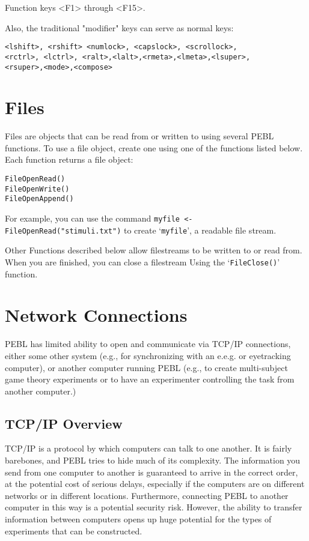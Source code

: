 Function keys <F1> through <F15>.

Also, the traditional "modifier" keys can serve as normal keys:


\begin{verbatim}
<lshift>, <rshift> <numlock>, <capslock>, <scrollock>, 
<rctrl>, <lctrl>, <ralt>,<lalt>,<rmeta>,<lmeta>,<lsuper>,
<rsuper>,<mode>,<compose>

\end{verbatim}


\section{Files}

Files are objects that can be read from or written to using several PEBL functions. To use a file object, create one using one of the functions 
listed below.  Each function returns a file object:
\begin{verbatim}
FileOpenRead()
FileOpenWrite()
FileOpenAppend()
\end{verbatim}

For example, you can use the command \texttt{myfile <-
  FileOpenRead("stimuli.txt")} 
to create `\texttt{myfile}', a readable
file stream.


Other Functions described below allow filestreams to be written to 
or read from.  When you are finished, you can close a filestream 
Using the `\texttt{FileClose()}' function.


\section{Network Connections}

PEBL has limited ability to open and communicate via  TCP/IP
connections, either some other system (e.g., for synchronizing with an
e.e.g. or eyetracking computer), or another computer running PEBL
(e.g., to create multi-subject game theory experiments or to have an
experimenter controlling the task from another computer.)

\subsection{TCP/IP Overview}
TCP/IP is a protocol by which computers can talk to one another.  It
is fairly barebones, and PEBL tries to hide much of its
complexity. The information you send from one computer to another is
guaranteed to arrive in the correct order, at the potential cost of
serious delays, especially if the computers are on different networks
or in different locations.  Furthermore, connecting PEBL to another
computer in this way is a potential security risk. However, the
ability to transfer information between computers opens up huge
potential for the types of experiments that can be constructed.


